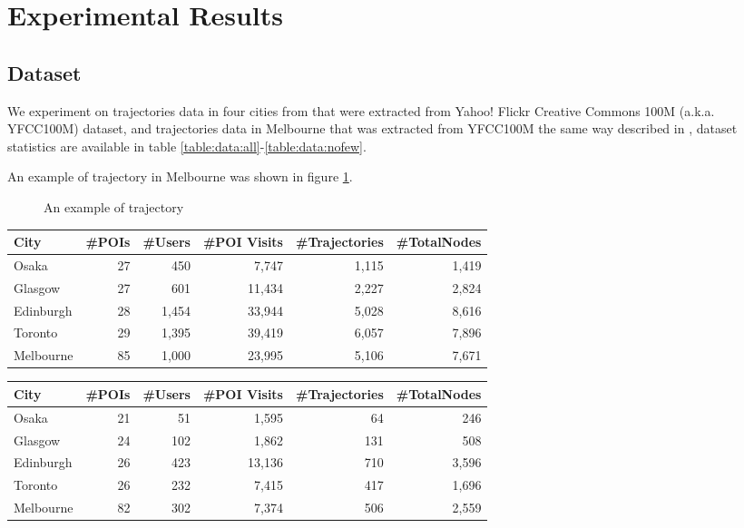 \section{Experimental Results}
\label{experiment}

\subsection{Dataset}
\label{experiment:dataset}
We experiment on trajectories data in four cities from \cite{ijcai15} that were
extracted from Yahoo! Flickr Creative Commons 100M (a.k.a. YFCC100M) dataset\cite{yfcc100m},
and trajectories data in Melbourne that was extracted from YFCC100M the same way described in \cite{ht10, ijcai15},
dataset statistics are available in table \ref{table:data:all}-\ref{table:data:nofew}.

An example of trajectory in Melbourne was shown in figure \ref{fig:traj}.

\begin{figure}
\centering
{}
\caption{An example of trajectory}
\label{fig:traj}
\end{figure}

\begin{table*}
\centering
\caption{Dataset with all trajectories}
\label{table:data:all}
\begin{tabular}{lrrrrr} \hline
\textbf{City} & \textbf{\#POIs} & \textbf{\#Users} & \textbf{\#POI Visits} & \textbf{\#Trajectories} & \textbf{\#TotalNodes} \\ \hline
Osaka & 27 & 450 & 7,747 & 1,115 & 1,419 \\ 
Glasgow & 27 & 601 & 11,434 & 2,227 & 2,824 \\ 
Edinburgh & 28 & 1,454 & 33,944 & 5,028 & 8,616 \\ 
Toronto & 29 & 1,395 & 39,419 & 6,057 & 7,896 \\ 
Melbourne & 85 & 1,000 & 23,995 & 5,106 & 7,671 \\ 
\hline
\end{tabular}
\end{table*}

\begin{table*}
\centering
\caption{Dataset without short trajectories}
\label{table:data:noshort}
\begin{tabular}{lrrrrr} \hline
\textbf{City} & \textbf{\#POIs} & \textbf{\#Users} & \textbf{\#POI Visits} & \textbf{\#Trajectories} & \textbf{\#TotalNodes} \\ \hline
Osaka & 21 & 51 & 1,595 & 64 & 246 \\ 
Glasgow & 24 & 102 & 1,862 & 131 & 508 \\ 
Edinburgh & 26 & 423 & 13,136 & 710 & 3,596 \\ 
Toronto & 26 & 232 & 7,415 & 417 & 1,696 \\ 
Melbourne & 82 & 302 & 7,374 & 506 & 2,559 \\ 
\hline
\end{tabular}
\end{table*}

